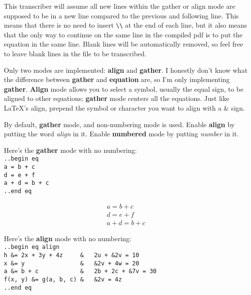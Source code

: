 \documentclass[12pt]{article}
\begin{document}
\begin{flushleft}
\medskip

This transcriber will assume all new lines within the gather or align mode are supposed to be in a new line compared to the previous and following line. This means that there is no need to insert \verb|\\| at the end of each line, but it also means that the only way to continue on the same line in the compiled pdf is to put the equation in the same line. Blank lines will be automatically removed, so feel free to leave blank lines in the file to be transcribed.

\medskip

Only two modes are implemented: \textbf{align} and \textbf{gather}. I honestly don't know what the difference between \textbf{gather} and \textbf{equation} are, so I'm only implementing \textbf{gather}. \textbf{Align} mode allows you to select a symbol, usually the equal sign, to be aligned to other equations; \textbf{gather} mode centers all the equations. Just like LaTeX's align, prepend the symbol or character you want to align with a \& sign.

\medskip

By default, \textbf{gather} mode, and non-numbering mode is used. Enable \textbf{align} by putting the word \emph{align} in it. Enable \textbf{numbered} mode by putting \emph{number} in it.

\medskip

Here's the \textbf{gather} mode with no numbering: \\
\verb|..begin eq|\\
\verb|a = b + c|\\
\verb|d = e + f|\\
\verb|a + d = b + c|\\
\verb|..end eq|

\begin{gather*}
a = b + c \\
d = e + f \\
a + d = b + c 
\end{gather*}

\medskip

Here's the \textbf{align} mode with no numbering: \\
\verb|..begin eq align|\\
\verb|h &= 2x + 3y + 4z     &   2u + &2v = 10|\\
\verb|x &= y                &   &2v + 4w = 20|\\
\verb|a &= b + c            &   2b + 2c + &7v = 30|\\
\verb|f(x, y) &= g(a, b, c) &   &2v = 4z|\\
\verb|..end eq|


\end{flushleft}
\end{document}
